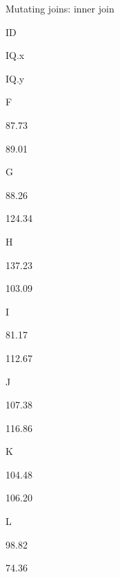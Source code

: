\documentclass[ignorenonframetext,]{beamer}
\newenvironment{Shaded}{\begin{snugshade}}{\end{snugshade}}
\newcommand{\KeywordTok}[1]{\textcolor[rgb]{0.13,0.29,0.53}{\textbf{#1}}}
\newcommand{\DataTypeTok}[1]{\textcolor[rgb]{0.13,0.29,0.53}{#1}}
\newcommand{\DecValTok}[1]{\textcolor[rgb]{0.00,0.00,0.81}{#1}}
\newcommand{\StringTok}[1]{\textcolor[rgb]{0.31,0.60,0.02}{#1}}
\newcommand{\OperatorTok}[1]{\textcolor[rgb]{0.81,0.36,0.00}{\textbf{#1}}}
\newcommand{\NormalTok}[1]{#1}
\begin{document}
\begin{frame}[fragile]{Mutating joins: inner join}

\begin{Shaded}
\end{Shaded}

ID

IQ.x

IQ.y

F

87.73

89.01

G

88.26

124.34

H

137.23

103.09

I

81.17

112.67

J

107.38

116.86

K

104.48

106.20

L

98.82

74.36

\end{frame}
\end{document}
